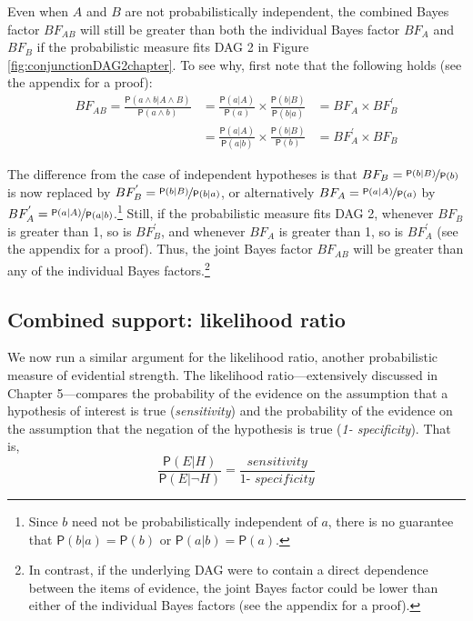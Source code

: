 \documentclass[
  10pt,
  dvipsnames,enabledeprecatedfontcommands]{scrartcl}
\newcommand{\pr}[1]{\ensuremath{\mathsf{P}(#1)}}
\begin{document}
Even when \(A\) and \(B\) are not probabilistically independent, the
combined Bayes factor \(BF_{AB}\) will still be greater than both the
individual Bayes factor \(BF_{A}\) and \(BF_{B}\) if the probabilistic
measure fits \textsf{DAG 2} in Figure \ref{fig:conjunctionDAG2chapter}.
To see why, first note that the following holds (see the appendix for a
proof): \begin{align}
BF_{AB} = \frac{\pr{a \wedge b\vert A\wedge B}}{\pr{a \wedge b}}&= \frac{\pr{a |A}}{\pr{a}} \times \frac{\pr{b |B}}{\pr{b|a}}&=  BF_{A}\times BF^{'}_{B} \nonumber \\
 & = \frac{\pr{a |A}}{\pr{a | b}} \times \frac{\pr{b |B}}{\pr{b}}& =  BF^{'}_{A}\times BF_{B}  \nonumber 
 \end{align}

\noindent The difference from the case of independent hypotheses is that
\(BF_B=\nicefrac{\pr{b \vert B}}{\pr{b}}\) is now replaced by
\(BF^{'}_B=\nicefrac{\pr{b \vert B}}{\pr{b\vert a}}\), or alternatively
\(BF_A=\nicefrac{\pr{a \vert A}}{\pr{a}}\) by
\(BF^{'}_A=\nicefrac{\pr{a \vert A}}{\pr{a\vert b}}\).\footnote{Since
  \(b\) need not be probabilistically independent of \(a\), there is no
  guarantee that \(\pr{b \vert a}=\pr{b}\) or \(\pr{a \vert b}=\pr{a}\).}
Still, if the probabilistic measure fits \textsf{DAG 2}, whenever
\(BF_B\) is greater than 1, so is \(BF^{'}_B\), and whenever \(BF_A\) is
greater than 1, so is \(BF^{'}_A\) (see the appendix for a proof). Thus,
the joint Bayes factor \(BF_{AB}\) will be greater than any of the
individual Bayes factors.\footnote{In contrast, if the underlying
  \textsf{DAG} were to contain a direct dependence between the items of
  evidence, the joint Bayes factor could be lower than either of the
  individual Bayes factors (see the appendix for a proof).}

\hypertarget{combined-support-likelihood-ratio}{%
\subsection{Combined support: likelihood
ratio}\label{combined-support-likelihood-ratio}}

We now run a similar argument for the likelihood ratio, another
probabilistic measure of evidential strength. The likelihood
ratio---extensively discussed in Chapter
5---compares the probability of the
evidence on the assumption that a hypothesis of interest is true
(\textit{sensitivity}) and the probability of the evidence on the
assumption that the negation of the hypothesis is true
(\textit{1- specificity}). That is,
\[\frac{\pr{E \vert H}}{\pr{E \vert \neg H}}=\frac{\textit{sensitivity}}{\textit{1- specificity}}\]
\end{document}
